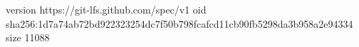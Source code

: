 version https://git-lfs.github.com/spec/v1
oid sha256:1d7a74ab72bd922323254dc7f50b798fcafcd11cb90fb5298da3b958a2e94334
size 11088
